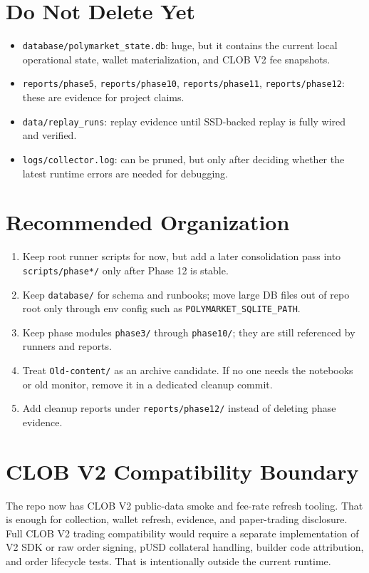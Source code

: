 \documentclass{article}
\begin{document}
\section*{Do Not Delete Yet}
\begin{itemize}[nosep]
\item \texttt{database/polymarket\_state.db}: huge, but it contains the current local operational state, wallet materialization, and CLOB V2 fee snapshots.
\item \texttt{reports/phase5}, \texttt{reports/phase10}, \texttt{reports/phase11}, \texttt{reports/phase12}: these are evidence for project claims.
\item \texttt{data/replay\_runs}: replay evidence until SSD-backed replay is fully wired and verified.
\item \texttt{logs/collector.log}: can be pruned, but only after deciding whether the latest runtime errors are needed for debugging.
\end{itemize}

\section*{Recommended Organization}
\begin{enumerate}[nosep]
\item Keep root runner scripts for now, but add a later consolidation pass into \texttt{scripts/phase*/} only after Phase 12 is stable.
\item Keep \texttt{database/} for schema and runbooks; move large DB files out of repo root only through env config such as \texttt{POLYMARKET\_SQLITE\_PATH}.
\item Keep phase modules \texttt{phase3/} through \texttt{phase10/}; they are still referenced by runners and reports.
\item Treat \texttt{Old-content/} as an archive candidate. If no one needs the notebooks or old monitor, remove it in a dedicated cleanup commit.
\item Add cleanup reports under \texttt{reports/phase12/} instead of deleting phase evidence.
\end{enumerate}

\section*{CLOB V2 Compatibility Boundary}
The repo now has CLOB V2 public-data smoke and fee-rate refresh tooling. That is enough for collection, wallet refresh, evidence, and paper-trading disclosure. Full CLOB V2 trading compatibility would require a separate implementation of V2 SDK or raw order signing, pUSD collateral handling, builder code attribution, and order lifecycle tests. That is intentionally outside the current runtime.
\end{document}

